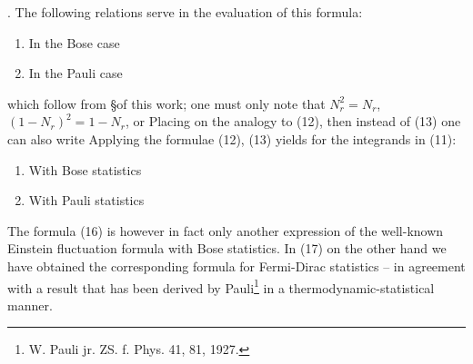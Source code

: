 \begin{paper}{1}
{\cdot{}.
}
The following relations serve in the evaluation of this formula:
\begin{enumerate}
\item{In the Bose case}
\item{In the Pauli case}
\end{enumerate}
which follow from \S of this work; one must only note that $N_r^2=N_r$, $(1-N_r)^2=1-N_r$, or
Placing  on the analogy to (12), then instead of (13) one can also write
Applying the formulae (12), (13) yields for the integrands in (11):
\begin{enumerate}
	\item With Bose statistics
	\item With Pauli statistics
\end{enumerate}

The formula (16) is however in fact only another expression of the well-known Einstein fluctuation formula with Bose statistics. In (17) on the other hand we have obtained the corresponding formula for Fermi-Dirac statistics -- in agreement with a result that has been derived by Pauli\footnote{W. Pauli jr.  ZS. f. Phys. 41, 81, 1927.} in a thermodynamic-statistical manner.


\end{paper}
